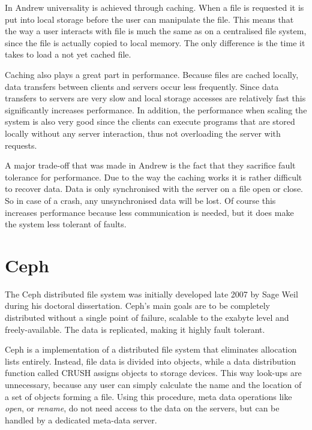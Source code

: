 \documentclass[a4paper,12px]{article}
\begin{document}
In Andrew universality is achieved through caching. When a file is requested it
is put into local storage before the user can manipulate the file. This means
that the way a user interacts with file is much the same as on a centralised
file system, since the file is actually copied to local memory. The only
difference is the time it takes to load a not yet cached file. \citet{concepts}

Caching also plays a great part in performance. Because files are cached
locally, data transfers between clients and servers occur less frequently. Since
data transfers to servers are very slow and local storage accesses are
relatively fast this significantly increases performance. In addition, the
performance when scaling the system is also very good since the clients can
execute programs that are stored locally without any server interaction, thus
not overloading the server with requests. \citet{andrew}

A major trade-off that was made in Andrew is the fact that they sacrifice fault
tolerance for performance. Due to the way the caching works it is rather
difficult to recover data. Data is only synchronised with the server on a file
open or close. \citet{andrew} So in case of a crash, any unsynchronised data will
be lost.  Of course this increases performance because less communication is
needed, but it does make the system less tolerant of faults.

\section{Ceph}

The Ceph distributed file system was initially developed late 2007 by Sage Weil
during his doctoral dissertation. \citet{weil2006ceph} Ceph's main goals are to
be completely distributed without a single point of failure, scalable to the
exabyte level and freely-available. The data is replicated, making it highly
fault tolerant.

Ceph is a implementation of a distributed file system that eliminates allocation
lists entirely. Instead, file data is divided into objects, while a data
distribution function called CRUSH assigns objects to storage devices. This way
look-ups are unnecessary, because any user can simply calculate the name and the
location of a set of objects forming a file.  Using this procedure, meta data
operations like \textit{open}, or \textit{rename}, do not need access to the
data on the servers, but can be handled by a dedicated meta-data server.
\citet{weil2006ceph}
\end{document}
